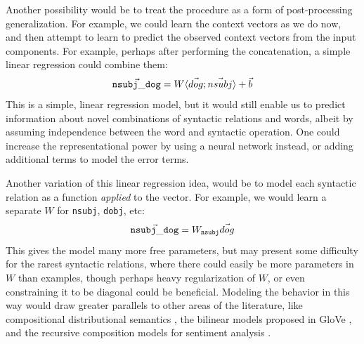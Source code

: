 \documentclass[12pt]{article}
\begin{document}
Another possibility would be to treat the procedure as a form of post-processing
generalization. For example, we could learn the context vectors as we do now, and
then attempt to learn to predict the observed context vectors from the input
components. For example, perhaps after performing the concatenation, a simple
linear regression could combine them:
\begin{equation*}
  \vec{ {\tt nsubj\_dog} } = W\langle \vec{dog} ; \vec{nsubj} \rangle + \vec{b}
\end{equation*}
This is a simple, linear regression model, but it would still enable us to
predict information about novel combinations of syntactic relations and words,
albeit by assuming independence between the word and syntactic operation. One
could increase the representational power by using a neural network instead,
or adding additional terms to model the error terms.

Another variation of this linear regression idea, would be to model each
syntactic relation as a function {\em applied} to the vector. For example,
we would learn a separate $W$ for {\tt nsubj}, {\tt dobj}, etc:
\begin{equation*}
  \vec{ {\tt nsubj\_dog} } = W_{{\tt nsubj}}\vec{dog}
\end{equation*}
This gives the model many more free parameters, but may present some difficulty
for the rarest syntactic relations, where there could easily be more parameters
in $W$ than examples, though perhaps heavy regularization of $W$, or even
constraining it to be diagonal could be beneficial. Modeling the behavior in
this way would draw greater parallels to other areas of the literature,
like compositional distributional semantics \cite{baroni:2010:emnlp,coecke:2011:la,grefenstette:2011:emnlp,baroni:2014:li}, the
bilinear models proposed in GloVe \cite{pennington:2014:emnlp}, and the recursive
composition models for sentiment analysis \cite{socher:2013:emnlp}.
\end{document}
